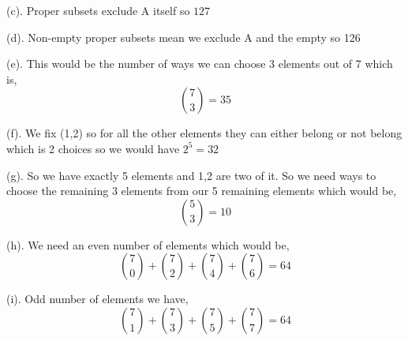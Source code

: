 \documentclass[a4paper]{report}
\begin{document}
(c). Proper subsets exclude A itself so $127$

(d). Non-empty proper subsets mean we exclude A and the empty so 126

(e). This would be the number of ways we can choose 3 elements out of 7 which is, 
$$ {7 \choose 3} = 35 $$ 


(f). We fix (1,2) so for all the other elements they can either belong or not belong which is 2 choices so we would have $2^{5} = 32$

(g). So we have exactly 5 elements and 1,2 are two of it. So we need ways to choose the remaining 3 elements from our 5 remaining elements which would be, 
$$ {5 \choose 3} = 10$$ 

(h). We need an even number of elements which would be, 
$$ {7 \choose 0 } + {7 \choose 2} + {7 \choose 4 } + { 7 \choose 6} = 64 $$ 

(i). Odd number of elements we have, 
$$ {7 \choose 1 } + {7 \choose 3} + {7 \choose 5 } + { 7 \choose 7} = 64 $$ 
\end{document}
